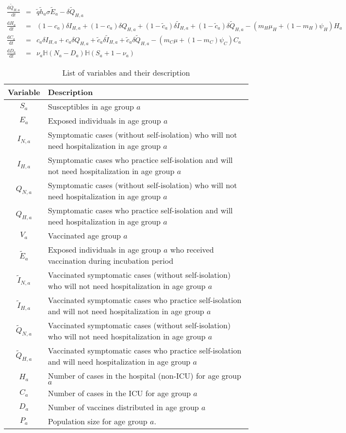 \documentclass[10pt]{article}
\begin{document}
\begin{eqnarray}
\frac{\text{d}\tilde Q_{H,a}}{\text{d}t}&=&\tilde q\tilde h_a\sigma \tilde E_a  - \delta \tilde Q_{H,a} \\
\frac{\text{d}H_{a}}{\text{d}t}&=& (1-c_a)\delta I_{H,a}+ (1-c_a)\delta Q_{H,a} +  (1-\tilde c_a)\delta \tilde I_{H,a}+ (1-\tilde c_a)\delta \tilde Q_{H,a} - \left(m_H \mu_H +(1-m_H) \psi_H \right)  H_a \\
\frac{\text{d}C_{a}}{\text{d}t}&=&  c_a \delta I_{H,a}+ c_a \delta Q_{H,a} +  \tilde c_a \delta \tilde I_{H,a}+ \tilde c_a \delta  \tilde Q_{H,a} - \left(m_C \mu +(1-m_C) \psi_C \right) C_a \\
\frac{\text{d}D_a}{\text{d}t}&=& \nu_a \mathbb{H}(N_a-D_a)\mathbb{H}(S_a+1-\nu_a)
\end{eqnarray}

\begin{table}
\centering \caption{List of variables and their description}
\begin{tabular}{cl}
Variable  & Description \\
\hline  $S_a$ & Susceptibles in age group $a$ \\
 $E_a$ & Exposed individuals in age group $a$ \\
 $I_{N,a}$ & Symptomatic cases (without self-isolation) who will not need hospitalization in age group $a$ \\
 $I_{H,a}$ & Symptomatic cases who practice self-isolation and will not need hospitalization in age group $a$ \\
 $Q_{N,a}$ & Symptomatic cases (without self-isolation) who  will not need hospitalization in age group $a$ \\
 $Q_{H,a}$ & Symptomatic cases who practice self-isolation and will need hospitalization in age group $a$ \\
 $V_a$ & Vaccinated age group $a$ \\
 $ \tilde E_a$ & Exposed individuals in age group $a$ who received vaccination during incubation period\\
 $\tilde I_{N,a}$ & Vaccinated symptomatic cases (without self-isolation) who will not need hospitalization in age group $a$ \\
 $\tilde I_{H,a}$ & Vaccinated symptomatic cases who practice self-isolation and will not need hospitalization in age group $a$ \\
 $\tilde Q_{N,a}$ & Vaccinated symptomatic cases (without self-isolation) who  will not need hospitalization in age group $a$ \\
 $\tilde Q_{H,a}$ & Vaccinated symptomatic cases who practice self-isolation and will need hospitalization in age group $a$ \\ 
 $H_a$ & Number of cases in the hospital (non-ICU) for age group $a$ \\
 $C_a$ & Number of cases in the ICU for age group $a$ \\
 $D_a$ & Number of vaccines distributed in age group $a$ \\
 $P_a$ & Population size for age group $a$. 
\end{tabular}
\end{table}
\end{document}
